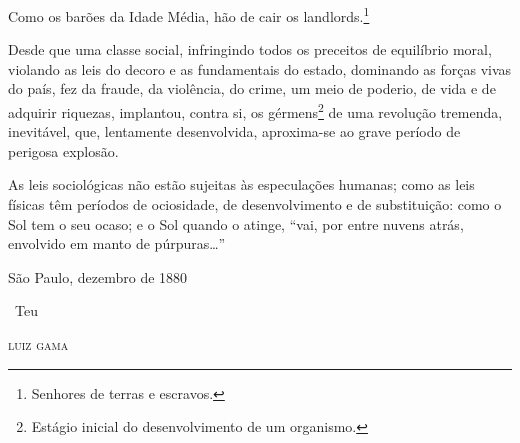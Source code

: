 Como os barões da Idade Média, hão de cair os landlords.\footnote{
  Senhores de terras e escravos.}

Desde que uma classe social, infringindo todos os preceitos de
equilíbrio moral, violando as leis do decoro e as fundamentais do
estado, dominando as forças vivas do país, fez da fraude, da violência,
do crime, um meio de poderio, de vida e de adquirir riquezas, implantou,
contra si, os gérmens\footnote{Estágio inicial do desenvolvimento de
  um organismo.} de uma
revolução tremenda, inevitável, que, lentamente desenvolvida,
aproxima-se ao grave período de perigosa explosão.

As leis sociológicas não estão sujeitas às especulações humanas; como as
leis físicas têm períodos de ociosidade, de desenvolvimento e de
substituição: como o Sol tem o seu ocaso; e o Sol quando o atinge, ``vai,
por entre nuvens atrás, envolvido em manto de púrpuras\ldots{}''

\medskip

\hfill São Paulo, dezembro de 1880

\hfill\ Teu

\hfill\textsc{luiz gama}


